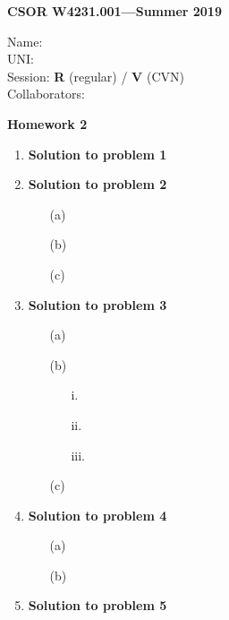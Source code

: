 \documentclass[11pt]{article}
\newcommand{\problemitem}[1]{
  \bigskip
  \item {\bf Solution to problem #1}
  \medskip
}
\begin{document}
\begin{flushright}
{\bf CSOR W4231.001---Summer 2019}
\end{flushright}
\begin{flushleft}
  Name: \\
  UNI: \\
  Session: {\bf R} (regular) / {\bf V} (CVN) \\ %
  Collaborators: \\ %
\end{flushleft}

\bigskip
\centerline{\bf Homework 2}

\begin{enumerate}

\problemitem{1}

\problemitem{2}
\begin{enumerate}
  \item[(a)]

  \item[(b)]

  \item[(c)]

\end{enumerate}

\problemitem{3}
\begin{enumerate}
  \item[(a)]

  \item[(b)]
    \begin{enumerate}
      \item[i.]

      \item[ii.]

      \item[iii.]

    \end{enumerate}
  \item[(c)]

\end{enumerate}

\problemitem{4}
\begin{enumerate}
  \item[(a)]

  \item[(b)]

\end{enumerate}

\problemitem{5}

\end{enumerate}
\end{document}
